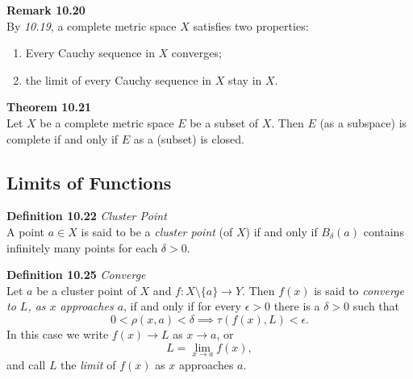 \documentclass[8pt,landscape]{article}
\begin{document}
\begin{multicols}{3}
\textbf{Remark 10.20} \\
By \emph{10.19}, a complete metric space $X$ satisfies two properties:
\begin{enumerate}
    \item Every Cauchy sequence in $X$ converges;
    \item the limit of every Cauchy sequence in $X$ stay in $X$.
\end{enumerate}

\textbf{Theorem 10.21} \\
Let $X$ be a complete metric space $E$ be a subset of $X$.
Then $E$ (as a subspace) is complete if and only if $E$ as a (subset) is closed.

\subsection{Limits of Functions}

\textbf{Definition 10.22} \emph{Cluster Point} \\
A point $a \in X$ is said to be a \emph{cluster point} (of $X$) if and only if
$B_\delta (a)$ contains infinitely many points for each $\delta > 0$.

\textbf{Definition 10.25} \emph{Converge} \\
Let $a$ be a cluster point of $X$ and $f : X \setminus \{a\} \to Y$.
Then $f(x)$ is said to \emph{converge to $L$, as $x$ approaches $a$},
if and only if for every $\epsilon > 0$ there is a $\delta > 0$ such that
\[
    0 < \rho (x, a) < \delta \implies \tau (f(x), L) < \epsilon.
\]
In this case we write $f(x) \to L$ as $x \to a$, or
\[
    L = \lim_{x \to a} f(x),
\]
and call $L$ the \emph{limit} of $f(x)$ as $x$ approaches $a$.


\end{multicols}
\end{document}

